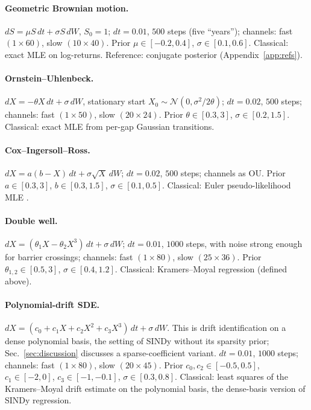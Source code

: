 \documentclass[10pt]{article}
\newcommand{\N}{\mathcal{N}}
\begin{document}
\paragraph{Geometric Brownian motion.} $dS = \mu S\,dt + \sigma S\,dW$, $S_0 = 1$; $dt = 0.01$, $500$
steps (five ``years''); channels: fast $(1 \times 60)$, slow $(10 \times 40)$. Prior
$\mu \in [-0.2, 0.4]$, $\sigma \in [0.1, 0.6]$. Classical: exact MLE on log-returns. Reference:
conjugate posterior (Appendix~\ref{app:refs}).

\paragraph{Ornstein--Uhlenbeck.} $dX = -\theta X\,dt + \sigma\,dW$, stationary start
$X_0 \sim \N(0, \sigma^2/2\theta)$; $dt = 0.02$, $500$ steps; channels: fast $(1 \times 50)$, slow
$(20 \times 24)$. Prior $\theta \in [0.3, 3]$, $\sigma \in [0.2, 1.5]$. Classical: exact MLE from
per-gap Gaussian transitions.

\paragraph{Cox--Ingersoll--Ross.} $dX = a(b - X)\,dt + \sigma\sqrt{X}\,dW$; $dt = 0.02$, $500$ steps;
channels as OU. Prior $a \in [0.3, 3]$, $b \in [0.3, 1.5]$, $\sigma \in [0.1, 0.5]$. Classical: Euler
pseudo-likelihood MLE \citep{cox1985}.

\paragraph{Double well.} $dX = (\theta_1 X - \theta_2 X^3)\,dt + \sigma\,dW$; $dt = 0.01$, $1000$
steps, with noise strong enough for barrier crossings; channels: fast $(1 \times 80)$, slow
$(25 \times 36)$. Prior $\theta_{1,2} \in [0.5, 3]$, $\sigma \in [0.4, 1.2]$. Classical: Kramers--Moyal
regression (defined above).

\paragraph{Polynomial-drift SDE.} $dX = (c_0 + c_1 X + c_2 X^2 + c_3 X^3)\,dt + \sigma\,dW$. This is
drift identification on a dense polynomial basis, the setting of SINDy \citep{brunton2016} without its
sparsity prior; Sec.~\ref{sec:discussion} discusses a sparse-coefficient variant. $dt = 0.01$, $1000$
steps; channels: fast $(1 \times 80)$, slow $(20 \times 45)$. Prior $c_0, c_2 \in [-0.5, 0.5]$,
$c_1 \in [-2, 0]$, $c_3 \in [-1, -0.1]$, $\sigma \in [0.3, 0.8]$. Classical: least squares of the
Kramers--Moyal drift estimate on the polynomial basis, the dense-basis version of SINDy regression.
\end{document}
